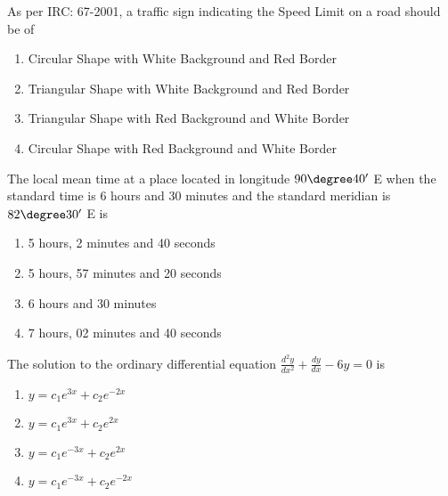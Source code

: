 \item As per IRC: 67-2001, a traffic sign indicating the Speed Limit on a road should be of
        \begin{enumerate}
            \item Circular Shape with White Background and Red Border
            \item Triangular Shape with White Background and Red Border
            \item Triangular Shape with Red Background and White Border
            \item Circular Shape with Red Background and White Border
        \end{enumerate}

\item The local mean time at a place located in longitude $90\degree 40'$ E when the standard
time is 6 hours and 30 minutes and the standard meridian is $82\degree 30'$ E is
    \begin{multicols}{2}
        \begin{enumerate}
            \item 5 hours, 2 minutes and 40 seconds
            \item 5 hours, 57 minutes and 20 seconds
            \item 6 hours and 30 minutes
            \item 7 hours, 02 minutes and 40 seconds
        \end{enumerate}
    \end{multicols}

\item The solution to the ordinary differential equation
    $\frac{d^{2}y}{dx^{2}} + \frac{dy}{dx} - 6y = 0$ is
    \begin{multicols}{2}
        \begin{enumerate}
            \item $y=c_1e^{3x} + c_2e^{-2x}$
            \item $y=c_1e^{3x} + c_2e^{2x}$
            \item $y=c_1e^{-3x} + c_2e^{2x}$
            \item $y=c_1e^{-3x} + c_2e^{-2x}$
        \end{enumerate}
    \end{multicols}